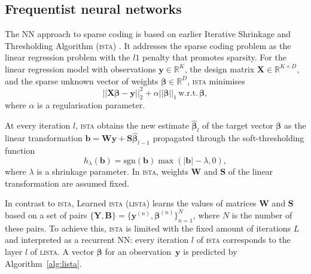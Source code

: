 \documentclass{article}
\begin{document}
\subsection{Frequentist neural networks}  
\label{subsec:nn_sc}
  The NN approach to sparse coding is based on earlier Iterative Shrinkage and Thresholding Algorithm (\textsc{ista}) \cite{daubechies2004iterative}. It addresses the sparse coding problem as the linear regression problem with the $l1$ penalty that promotes sparsity. For the linear regression model with observations $\mathbf{y} \in \mathbb{R}^K$, the design matrix $\mathbf{X} \in \mathbb{R}^{K \times D}$, and the sparse unknown vector of weights $\boldsymbol\beta \in \mathbb{R}^D$, \textsc{ista} minimises
  \begin{equation}
  \label{eq:regression_problem}
  ||\mathbf{X}\boldsymbol\beta - \mathbf{y}||_2^2 + \alpha ||\boldsymbol\beta||_1 \, \text{w.r.t.} \,\boldsymbol\beta,
  \end{equation}
  where $\alpha$ is a regularisation parameter.
  
  At every iteration $l$, \textsc{ista} obtains the new estimate $\widehat{\boldsymbol\beta}_l$ of the target vector $\boldsymbol\beta$ as the linear transformation $\mathbf{b} = \mathbf{W}\mathbf{y} + \mathbf{S}\widehat{\boldsymbol\beta}_{l-1}$ propagated through the soft-thresholding function %
  \begin{equation}
  h_\lambda(\mathbf{b}) = \text{sgn}(\mathbf{b}) \max(|\mathbf{b}| - \lambda, 0),
  \end{equation}
  where $\lambda$ is a shrinkage parameter.
  In \textsc{ista}, weights $\mathbf{W}$ and $\mathbf{S}$ of the linear transformation are assumed fixed.
  
  In contrast to \textsc{ista}, Learned \textsc{ista} (\textsc{lista}) \cite{gregor2010learning} learns the values of matrices $\mathbf{W}$ and $\mathbf{S}$ based on a set of pairs $\{\mathbf{Y}, \mathbf{B}\}=\{\mathbf{y}^{(n)}, \boldsymbol\beta^{(n)}\}_{n=1}^N$, where $N$ is the number of these pairs. To achieve this, \textsc{ista} is limited with the fixed amount of iterations $L$ and interpreted as a recurrent NN: every iteration $l$ of \textsc{ista} corresponds to the layer $l$ of \textsc{lista}. A vector $\boldsymbol\beta$ for an observation~$\mathbf{y}$ is predicted by Algorithm~\ref{alg:lista}.
  
\end{document}
